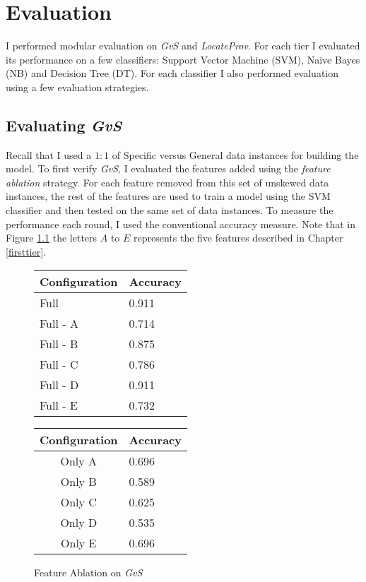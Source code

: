 \chapter{Evaluation}
\label{evaluation}
I performed modular evaluation on {\it GvS} and {\it LocateProv}. For each tier I evaluated its performance on a few classifiers: Support Vector Machine (SVM), Naive Bayes (NB) and Decision Tree (DT). For each classifier I also performed evaluation using a few evaluation strategies.

\section{Evaluating {\it GvS}}
\label{eval:first}
Recall that I used a $1:1$ of Specific versus General data instances for building the model. To first verify {\it GvS}, I evaluated the features added using the {\it feature ablation} strategy. For each feature removed from this set of unskewed data instances, the rest of the features are used to train a model using the SVM classifier and then tested on the same set of data instances. To measure the performance each round, I used the conventional accuracy measure. Note that in Figure \ref{fig:ablation_first} the letters $A$ to $E$ represents the five features described in Chapter \ref{firsttier}.

\begin{figure}[ht]
\begin{minipage}[b]{0.45\linewidth}\centering
\begin{tabular}{ l | l }
Configuration & Accuracy \\
\hline
Full		& 0.911 \\
Full - A	& 0.714 \\
Full - B	& 0.875 \\
Full - C	& 0.786 \\
Full - D	& 0.911 \\
Full - E	& 0.732 \\
\end{tabular}
\end{minipage}
\hspace{0.5cm}
\begin{minipage}[b]{0.45\linewidth}\centering
\begin{tabular}{ c | l }
Configuration & Accuracy \\
\hline
Only A	& 0.696 \\
Only B	& 0.589 \\
Only C	& 0.625 \\
Only D	& 0.535 \\
Only E	& 0.696 \\
\end{tabular}
\end{minipage}
\caption{Feature Ablation on {\it GvS}}
\label{fig:ablation_first}
\end{figure}

